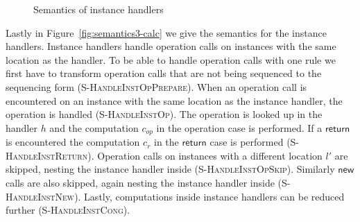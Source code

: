 {\begin{figure}[h]
\caption{Semantics of instance handlers}
\centering
{}
\end{figure}

Lastly in Figure~\ref{fig:semantics3-calc} we give the semantics for the instance handlers.
Instance handlers handle operation calls on instances with the same location as the handler.
To be able to handle operation calls with one rule we first have to transform operation calls that are not being sequenced to the sequencing form (\textsc{S-HandleInstOpPrepare}).
When an operation call is encountered on an instance with the same location as the instance handler, the operation is handled (\textsc{S-HandleInstOp}).
The operation is looked up in the handler $h$ and the computation $c_{op}$ in the operation case is performed.
If a $\mathsf{return}$ is encountered the computation $c_r$ in the $\mathsf{return}$ case is performed (\textsc{S-HandleInstReturn}).
Operation calls on instances with a different location $l'$ are skipped, nesting the instance handler inside (\textsc{S-HandleInstOpSkip}).
Similarly $\mathsf{new}$ calls are also skipped, again nesting the instance handler inside (\textsc{S-HandleInstNew}).
Lastly, computations inside instance handlers can be reduced further (\textsc{S-HandleInstCong}).

}
